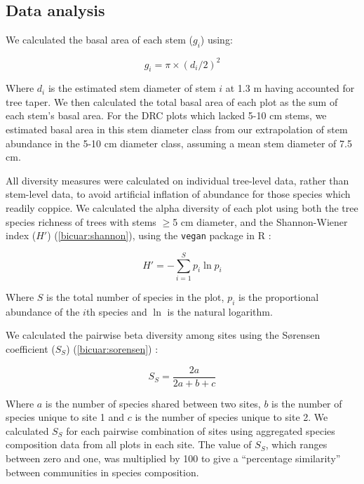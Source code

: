 \begin{refsection}
\subsection{Data analysis}
\label{bicuar:ssec:data_analysis}

We calculated the basal area of each stem ($g_{i}$) using:

\begin{equation}
	g_{i} = \pi{} \times (d_{i} / 2)^{2}
\end{equation}

Where $d_{i}$ is the estimated stem diameter of stem $i$ at 1.3 m having accounted for tree taper. We then calculated the total basal area of each plot as the sum of each stem's basal area. For the DRC plots which lacked 5-10 cm stems, we estimated basal area in this stem diameter class from our extrapolation of stem abundance in the 5-10 cm diameter class, assuming a mean stem diameter of 7.5 cm.

All diversity measures were calculated on individual tree-level data, rather than stem-level data, to avoid artificial inflation of abundance for those species which readily coppice. We calculated the alpha diversity of each plot using both the tree species richness of trees with stems $\ge$5 cm diameter, and the Shannon-Wiener index ($H'$) (\autoref{bicuar:shannon}), using the \texttt{vegan} package in R \citep{vegan}:

\begin{equation}
	H' = -\sum^{S}_{i=1} p_{i} \ln{p_{i}}
	\label{bicuar:shannon}
\end{equation}

Where $S$ is the total number of species in the plot, $p_{i}$ is the proportional abundance of the $i$th species and $\ln$ is the natural logarithm.

We calculated the pairwise beta diversity among sites using the S\o{}rensen coefficient ($S_{S}$) (\autoref{bicuar:sorensen}) \citep{Koleff2003}:

\begin{equation}
	\label{bicuar:sorensen}
	S_S = \frac{2a}{2a + b + c}
\end{equation}

Where $a$ is the number of species shared between two sites, $b$ is the number of species unique to site 1 and $c$ is the number of species unique to site 2. We calculated $S_{S}$ for each pairwise combination of sites using aggregated species composition data from all plots in each site. The value of $S_{S}$, which ranges between zero and one, was multiplied by 100 to give a ``percentage similarity'' between communities in species composition.


\end{refsection}
